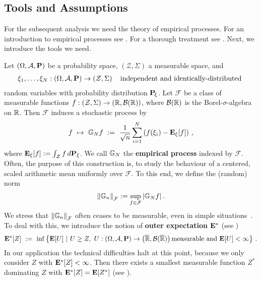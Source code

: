 \subsection{Tools and Assumptions}
For the subsequent analysis we need the theory of empirical processes.
For an introduction to empirical processes see \cite[§19]{Vaart2000}. For a thorough treatment see \cite[§2]{vaart2013}. Next, we introduce the tools we need.

Let 
$
  \left( 
    \Omega,
    \mathcal{A},
    \P
  \right)
$
be a probability space,
$
  \left( 
    \mathcal{Z},
    \Sigma
  \right)
$
a measurable space, and 
\begin{gather*}
  \xi_1,\ldots,\xi_N
  :
  \left( 
    \Omega,
    \mathcal{A},
    \P
  \right)
  \to
  \left( 
    \mathcal{Z},
    \Sigma
  \right)
  \quad
  \text{independent and identically-distributed
  }
\end{gather*}
random variables
with probability distribution $\P_{\!\xi}$.
Let $\mathcal{F}$ be a class of measurable functions 
$
  f:
  \left( 
    \mathcal{Z},
    \Sigma
  \right)
    \to
  \left( 
    \R,
    \mathcal{B}(\R)
  \right)
$, where
$
    \mathcal{B}(\R)
$
is the Borel-$\sigma$-algebra on $\R$.
Then $\mathcal{F}$
induces a stochastic process by
\begin{gather}
  f
  \ 
  \mapsto
  \ 
  \G_N f 
  \ 
  :=
  \ 
  \frac{1}{\sqrt{n}}
  \sum_{i=1}^{N} 
  \left(
    f(\xi_i)
    -
    \E_\xi[f]
  \right)
  \,,
\end{gather}
where
$
    \E_\xi[f]
    :=
    \int_\mathcal{Z}
    f
    \,
    d\P_\xi
$.
We call
$\G_N$ the  \textbf{empirical process} indexed by $\mathcal{F}$.
Often, the purpose of this construction is, to study the behaviour of a centered, scaled arithmetic mean uniformly over $\mathcal{F}$.
To this end, we define the (random) norm
\begin{gather}
  \norm{\G_n}_\mathcal{F}
  :=
  \sup_
        { f \in \mathcal{F}}
        \left|
          \G_N f
        \right|
        .
\end{gather}
We stress that 
$
  \norm{\G_n}_\mathcal{F}
$
often ceases to be measurable, even in simple situations~\cite[page 3]{vaart2013}.
To deal with this, we introduce the notion of \textbf{outer expectation} $\E^*$ (see \cite[page~6]{vaart2013})
\begin{gather*}
  \E^*[Z]
  \ 
  :=
  \ 
    \inf
  \left\{ 
    \E[U]
  \ 
  \lvert
  \ 
    U\ge Z,
    \ 
    U:
  \left( 
    \Omega,
    \mathcal{A},
    \P
  \right)
  \to 
  \left( 
    \overline{\R},
    \mathcal{B}(\overline{\R})
  \right)
  \text{measurable and}
  \ 
  \E[U]<\infty
  \right\}
  \,.
\end{gather*}
In our application the technical difficulties halt at this point, because we only consider $Z$ with $\E^*[Z]<\infty$. Then there exists a smallest measurable function $Z^*$ dominating $Z$ with
$\E^*[Z]=\E[Z^*]$ (see \cite[Lemma~1.2.1]{vaart2013}).

